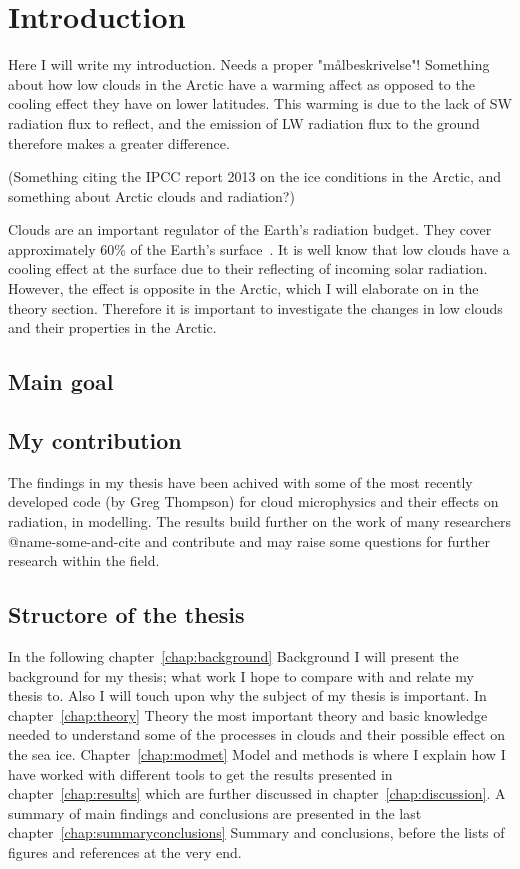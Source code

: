 \chapter{Introduction}
\label{chap:introduction}
Here I will write my introduction. Needs a proper "målbeskrivelse"!
Something about how low clouds in the Arctic have a warming affect as opposed to the cooling effect they have on lower latitudes. This warming is due to the lack of SW radiation flux to reflect, and the emission of LW radiation flux to the ground therefore makes a greater difference.

(Something citing the IPCC report 2013 on the ice conditions in the Arctic, and something about Arctic clouds and radiation?)

Clouds are an important regulator of the Earth's radiation budget. They cover approximately 60\% of the Earth's surface~\citep{Lohmann2005}. It is well know that low clouds have a cooling effect at the surface due to their reflecting of incoming solar radiation. However, the effect is opposite in the Arctic, which I will elaborate on in the theory section. Therefore it is important to investigate the changes in low clouds and their properties in the Arctic.

\section{Main goal}
\section{My contribution}
The findings in my thesis have been achived with some of the most recently developed code (by Greg Thompson) for cloud microphysics and their effects on radiation, in modelling. The results build further on the work of many researchers @name-some-and-cite and contribute and may raise some questions for further research within the field.

\section{Structore of the thesis}
In the following chapter~\ref{chap:background} Background I will present the background for my thesis; what work I hope to compare with and relate my thesis to. Also I will touch upon why the subject of my thesis is important. In chapter~\ref{chap:theory} Theory the most important theory and basic knowledge needed to understand some of the processes in clouds and their possible effect on the sea ice. Chapter~\ref{chap:modmet} Model and methods is where I explain how I have worked with different tools to get the results presented in chapter~\ref{chap:results} which are further discussed in chapter~\ref{chap:discussion}. A summary of main findings and conclusions are presented in the last chapter~\ref{chap:summaryconclusions} Summary and conclusions, before the lists of figures and references at the very end.

